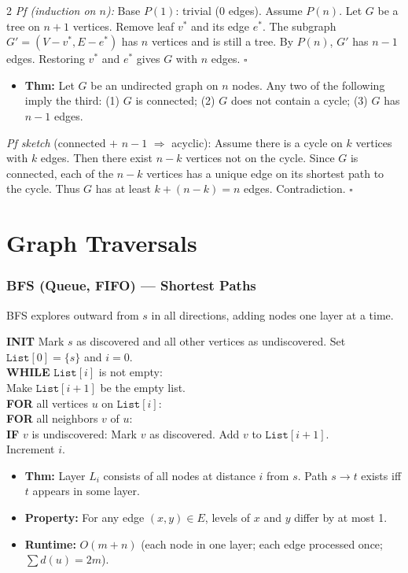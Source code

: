 \documentclass[9pt]{article}
\begin{document}
\begin{multicols}{2}
\textit{Pf (induction on $n$):} Base $P(1)$: trivial (0 edges). Assume $P(n)$. Let $G$ be a tree on $n+1$ vertices. Remove leaf $v^*$ and its edge $e^*$. The subgraph $G'=(V-v^*,E-e^*)$ has $n$ vertices and is still a tree. By $P(n)$, $G'$ has $n-1$ edges. Restoring $v^*$ and $e^*$ gives $G$ with $n$ edges. $\square$

\begin{itemize}
  \item \textbf{Thm:} Let $G$ be an undirected graph on $n$ nodes. Any two of the following imply the third: (1) $G$ is connected; (2) $G$ does not contain a cycle; (3) $G$ has $n-1$ edges.
\end{itemize}

\textit{Pf sketch} (connected $+$ $n-1$ $\Rightarrow$ acyclic): Assume there is a cycle on $k$ vertices with $k$ edges. Then there exist $n-k$ vertices not on the cycle. Since $G$ is connected, each of the $n-k$ vertices has a unique edge on its shortest path to the cycle. Thus $G$ has at least $k+(n-k)=n$ edges. Contradiction. $\square$

\section*{Graph Traversals}

\subsubsection*{BFS (Queue, FIFO) --- Shortest Paths}

BFS explores outward from $s$ in all directions, adding nodes one layer at a time.

\textbf{INIT} Mark $s$ as discovered and all other vertices as undiscovered. Set $\texttt{List}[0]=\{s\}$ and $i=0$.\\
\textbf{WHILE} $\texttt{List}[i]$ is not empty:\\
\hspace*{8pt}Make $\texttt{List}[i+1]$ be the empty list.\\
\hspace*{8pt}\textbf{FOR} all vertices $u$ on $\texttt{List}[i]$:\\
\hspace*{16pt}\textbf{FOR} all neighbors $v$ of $u$:\\
\hspace*{24pt}\textbf{IF} $v$ is undiscovered: Mark $v$ as discovered. Add $v$ to $\texttt{List}[i+1]$.\\
\hspace*{8pt}Increment $i$.
\begin{itemize}
  \item \textbf{Thm:} Layer $L_i$ consists of all nodes at distance $i$ from $s$. Path $s\to t$ exists iff $t$ appears in some layer.
  \item \textbf{Property:} For any edge $(x,y)\in E$, levels of $x$ and $y$ differ by at most 1.
  \item \textbf{Runtime:} $O(m+n)$ (each node in one layer; each edge processed once; $\sum d(u)=2m$).
\end{itemize}


\end{multicols}
\end{document}
